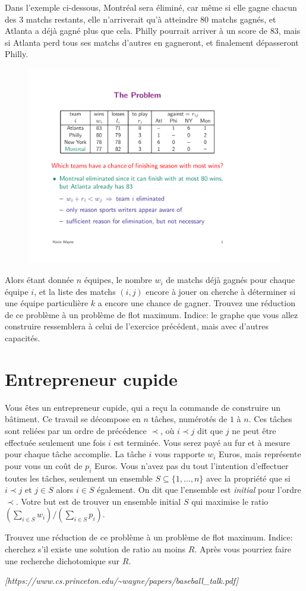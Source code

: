 \documentclass[12pt]{article}
\newcommand{\source}[1]{\begin{flushright}\emph{[#1]}\end{flushright}}
\begin{document}
Dans l'exemple ci-dessous, Montréal sera éliminé, car même si elle gagne chacun des 3 matchs restants, elle n'arriverait qu'à atteindre 80 matchs gagnés, et Atlanta a déjà gagné plus que cela. Philly pourrait arriver à un score de 83, mais si Atlanta  perd tous ses matchs d'autres en gagneront, et finalement dépasseront Philly.

\begin{figure}[h]
	\centerline{\includegraphics[width=12cm]{baseball.pdf}}
\end{figure}

Alors étant donnée $n$ équipes, le nombre $w_i$ de matchs déjà gagnés pour chaque équipe $i$, et la liste des matchs $(i,j)$ encore à jouer on cherche à déterminer si une équipe particulière $k$ a encore une chance de gagner.  Trouvez une réduction de ce problème à un problème de flot maximum. Indice: le graphe que vous allez construire ressemblera à celui de l'exercice précédent, mais avec d'autres capacités.

\section{Entrepreneur cupide}

Vous êtes un entrepreneur cupide, qui a reçu la commande de construire un bâtiment.  Ce travail se décompose en $n$ tâches, numérotés de $1$ à $n$. Ces tâches sont reliées par un ordre de précédence $\prec$, où $i\prec j$ dit que $j$ ne peut être effectuée seulement une fois $i$ est terminée.  Vous serez payé au fur et à mesure pour chaque tâche accomplie.  La tâche $i$ vous rapporte $w_i$ Euros, mais représente pour vous un coût de $p_i$ Euros. Vous n'avez pas du tout l'intention d'effectuer toutes les tâches, seulement un ensemble $S\subseteq \{1,\ldots, n\}$ avec la propriété que si $i\prec j$ et $j\in S$ alors $i\in S$ également.  On dit que l'ensemble est \emph{initial} pour l'ordre $\prec$.  Votre but est de trouver un ensemble initial $S$ qui maximise le ratio $(\sum_{i\in S} w_i )/ (\sum_{i\in S} p_i )$.

Trouvez une réduction de ce problème à un problème de flot maximum.  Indice: cherchez s'il existe une solution de ratio au moins $R$. Après vous pourriez faire une recherche dichotomique sur $R$.

\source{https://www.cs.princeton.edu/\~{}wayne/papers/baseball\_talk.pdf}
\end{document}
